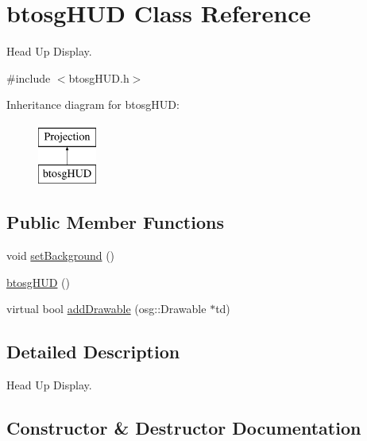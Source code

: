 \hypertarget{classbtosgHUD}{}\section{btosg\+H\+UD Class Reference}
\label{classbtosgHUD}


Head Up Display.  




{\ttfamily \#include $<$btosg\+H\+U\+D.\+h$>$}

Inheritance diagram for btosg\+H\+UD\+:\begin{figure}[H]
\begin{center}
\leavevmode
\includegraphics[height=2.000000cm]{classbtosgHUD}
\end{center}
\end{figure}
\subsection*{Public Member Functions}
\begin{DoxyCompactItemize}
\item 
void \hyperlink{classbtosgHUD_a18c1eb80934574e6bdabbbee43e0bfeb}{set\+Background} ()
\item 
\hyperlink{classbtosgHUD_a1aee59dc4eff398996632f1e4b3e70fd}{btosg\+H\+UD} ()
\item 
virtual bool \hyperlink{classbtosgHUD_a182be3e4bdf00f9ff2b9c482833089a4}{add\+Drawable} (osg\+::\+Drawable $\ast$td)
\end{DoxyCompactItemize}


\subsection{Detailed Description}
Head Up Display. 

\subsection{Constructor \& Destructor Documentation}
\mbox{\label{classbtosgHUD_a1aee59dc4eff398996632f1e4b3e70fd}} 
